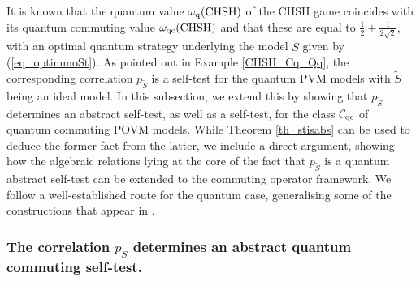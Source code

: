 \documentclass[11pt]{amsart}
\theoremstyle{definition}
\newcommand{\cl}[1]{\mathcal{#1}}
\begin{document}
It is known that the quantum value $\omega_{\rm q}({\rm CHSH})$ 
of the CHSH game coincides with its quantum commuting value $\omega_{\rm qc}({\rm CHSH})$ and that these are equal to $\frac{1}{2}+\frac{1}{2\sqrt{2}}$, with an optimal quantum 
strategy underlying the model $\tilde S$ given by (\ref{eq_optimmoSt}). 
As pointed out in Example \ref{CHSH_Cq_Qq}, 
the corresponding correlation $p_{\tilde S}$ is a self-test for the quantum PVM models with $\tilde S$ being an ideal model. In this subsection, we extend this by showing that $p_{\tilde S}$
determines an abstract self-test, as well as a self-test,  
for the class $\cl C_{\rm qc}$ of  quantum commuting POVM models.  
While Theorem \ref{th_stisabs} can be used to deduce the
former fact from the latter, we include a direct argument, showing
how the algebraic relations lying at the core of 
the fact that $p_{\tilde{S}}$ is a quantum abstract self-test can be extended to the commuting operator framework.  We follow a well-established route for the quantum case, 
generalising some of the constructions that appear in \cite{supic-bowles}.


\subsubsection{The correlation $p_{\tilde S}$ determines an abstract 
quantum commuting self-test.}
\end{document}
